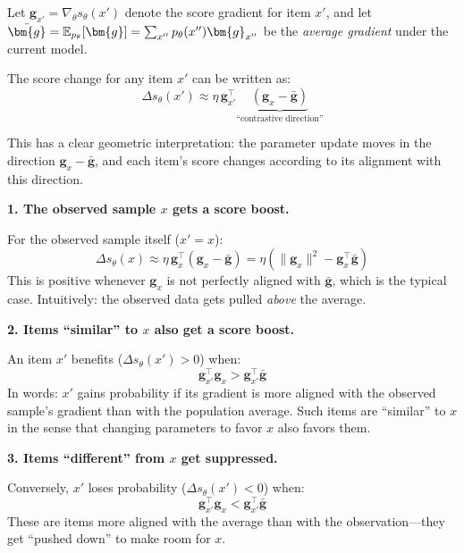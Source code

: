 \begin{notechapter}
\begin{intuition}
Let $\bm{g}_{x'} = \nabla_\theta s_\theta(x')$ denote the score gradient for item $x'$, and let $\bar{\bm{g}} = \E_{p_\theta}[\bm{g}] = \sum_{x''} p_\theta(x'') \bm{g}_{x''}$ be the \emph{average gradient} under the current model.

The score change for any item $x'$ can be written as:
\begin{equation}
\Delta s_\theta(x') \approx \eta \, \bm{g}_{x'}^\top \underbrace{\left(\bm{g}_x - \bar{\bm{g}}\right)}_{\text{``contrastive direction''}}
\end{equation}

This has a clear geometric interpretation: the parameter update moves in the direction $\bm{g}_x - \bar{\bm{g}}$, and each item's score changes according to its alignment with this direction.

\medskip
\textbf{1. The observed sample $x$ gets a score boost.}

For the observed sample itself ($x' = x$):
\begin{equation}
\Delta s_\theta(x) \approx \eta \, \bm{g}_x^\top (\bm{g}_x - \bar{\bm{g}}) = \eta \left(\|\bm{g}_x\|^2 - \bm{g}_x^\top \bar{\bm{g}}\right)
\end{equation}
This is positive whenever $\bm{g}_x$ is not perfectly aligned with $\bar{\bm{g}}$, which is the typical case. Intuitively: the observed data gets pulled \emph{above} the average.

\medskip
\textbf{2. Items ``similar'' to $x$ also get a score boost.}

An item $x'$ benefits ($\Delta s_\theta(x') > 0$) when:
\begin{equation}
\bm{g}_{x'}^\top \bm{g}_x > \bm{g}_{x'}^\top \bar{\bm{g}}
\end{equation}
In words: $x'$ gains probability if its gradient is more aligned with the observed sample's gradient than with the population average. Such items are ``similar'' to $x$ in the sense that changing parameters to favor $x$ also favors them.

\medskip
\textbf{3. Items ``different'' from $x$ get suppressed.}

Conversely, $x'$ loses probability ($\Delta s_\theta(x') < 0$) when:
\begin{equation}
\bm{g}_{x'}^\top \bm{g}_x < \bm{g}_{x'}^\top \bar{\bm{g}}
\end{equation}
These are items more aligned with the average than with the observation---they get ``pushed down'' to make room for $x$.


\end{intuition}
\end{notechapter}
